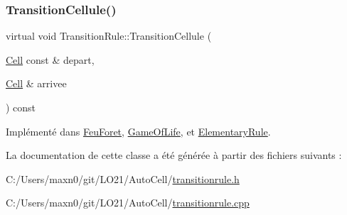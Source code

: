 \subsubsection{\texorpdfstring{Transition\+Cellule()}{TransitionCellule()}}
{\footnotesize\ttfamily virtual void Transition\+Rule\+::\+Transition\+Cellule (\begin{DoxyParamCaption}\item[{\mbox{\hyperlink{class_cell}{Cell}} const \&}]{depart,  }\item[{\mbox{\hyperlink{class_cell}{Cell}} \&}]{arrivee }\end{DoxyParamCaption}) const\hspace{0.3cm}{\ttfamily [pure virtual]}}



Implémenté dans \mbox{\hyperlink{class_feu_foret_a1fb3642690cc586faf0cbc6e9fae64cf}{Feu\+Foret}}, \mbox{\hyperlink{class_game_of_life_a12e6db1719e64adc023e1a7d2976d38d}{Game\+Of\+Life}}, et \mbox{\hyperlink{class_elementary_rule_a38451269153546c9d374f7f6df8cde6d}{Elementary\+Rule}}.



La documentation de cette classe a été générée à partir des fichiers suivants \+:\begin{DoxyCompactItemize}
\item 
C\+:/\+Users/maxn0/git/\+L\+O21/\+Auto\+Cell/\mbox{\hyperlink{transitionrule_8h}{transitionrule.\+h}}\item 
C\+:/\+Users/maxn0/git/\+L\+O21/\+Auto\+Cell/\mbox{\hyperlink{transitionrule_8cpp}{transitionrule.\+cpp}}\end{DoxyCompactItemize}
